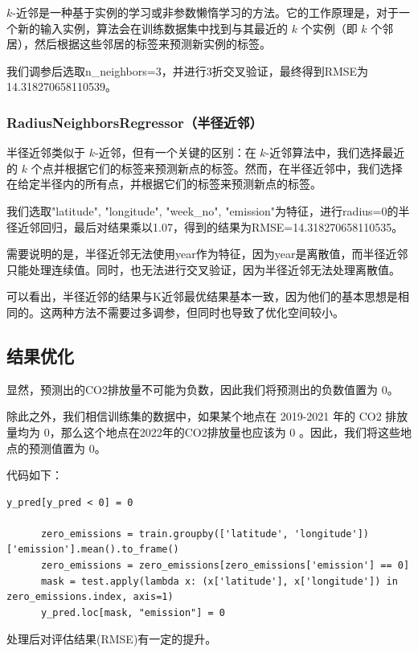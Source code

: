 \documentclass{ctexart}
\begin{document}
$k$-近邻是一种基于实例的学习或非参数懒惰学习的方法。它的工作原理是，对于一个新的输入实例，算法会在训练数据集中找到与其最近的 $k$ 个实例（即 $k$ 个邻居），然后根据这些邻居的标签来预测新实例的标签。

我们调参后选取n\_neighbors=3，并进行3折交叉验证，最终得到RMSE为14.318270658110539。

\subsubsection{RadiusNeighborsRegressor（半径近邻）}

半径近邻类似于 $k$-近邻，但有一个关键的区别：在 $k$-近邻算法中，我们选择最近的 $k$ 个点并根据它们的标签来预测新点的标签。然而，在半径近邻中，我们选择在给定半径内的所有点，并根据它们的标签来预测新点的标签。

我们选取"latitude", "longitude", "week\_no", "emission"为特征，进行radius=0的半径近邻回归，最后对结果乘以1.07，得到的结果为RMSE=14.318270658110535。

需要说明的是，半径近邻无法使用year作为特征，因为year是离散值，而半径近邻只能处理连续值。同时，也无法进行交叉验证，因为半径近邻无法处理离散值。

可以看出，半径近邻的结果与K近邻最优结果基本一致，因为他们的基本思想是相同的。这两种方法不需要过多调参，但同时也导致了优化空间较小。

\subsection{结果优化}

显然，预测出的CO2排放量不可能为负数，因此我们将预测出的负数值置为 0。

除此之外，我们相信训练集的数据中，如果某个地点在 2019-2021 年的 CO2 排放量均为 0，那么这个地点在2022年的CO2排放量也应该为 0 。因此，我们将这些地点的预测值置为 0。

代码如下：

\begin{lstlisting}[style=Python]
      y_pred[y_pred < 0] = 0
      
      zero_emissions = train.groupby(['latitude', 'longitude'])['emission'].mean().to_frame()
      zero_emissions = zero_emissions[zero_emissions['emission'] == 0]
      mask = test.apply(lambda x: (x['latitude'], x['longitude']) in zero_emissions.index, axis=1)
      y_pred.loc[mask, "emission"] = 0
\end{lstlisting}

处理后对评估结果(RMSE)有一定的提升。
\end{document}
